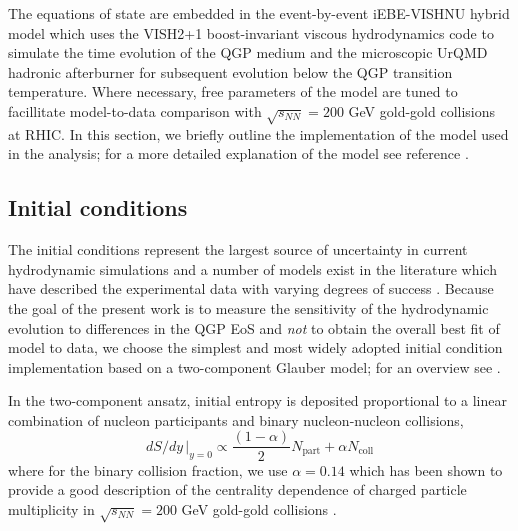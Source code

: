\documentclass[aps,prc,reprint,amsmath,nofootinbib,superscriptaddress]{revtex4-1}
\begin{document}
The equations of state are embedded in the event-by-event iEBE-VISHNU hybrid model which uses the VISH2+1 boost-invariant viscous hydrodynamics code \cite{Song:2007ux} to simulate the 
time evolution of the QGP medium and the microscopic UrQMD hadronic afterburner \cite{Bass:1998ca, Bleicher:1999xi} for subsequent evolution below the QGP transition temperature. Where necessary, free parameters of the model are tuned to facillitate model-to-data comparison with $\sqrt{s_{NN}}=200$ GeV gold-gold collisions at RHIC. In this section, we briefly outline
the implementation of the model used in the analysis; for a more detailed explanation of the model see reference \cite{Shen:2014vra}. 


\subsection{Initial conditions}
\label{initial_condition}

The initial conditions represent the largest source of uncertainty in current hydrodynamic simulations and a number of models exist in the literature which have described
the experimental data with varying degrees of success \cite{Schenke:2012wb, Niemi:2015qia, Chatterjee:2015aja, Moreland:2014oya, Drescher:2006pi, Adler:2013aqf}. Because the goal of the present work is to measure the sensitivity of the hydrodynamic evolution to differences in the QGP EoS and \emph{not} to obtain the overall best fit of model to data, we choose the simplest and most widely adopted initial condition implementation based on a two-component Glauber model; for an overview see \cite{Miller:2007ri}.

In the two-component ansatz, initial entropy is deposited proportional to a linear combination of nucleon participants and binary nucleon-nucleon collisions,
\begin{equation}
 dS/dy \,\vert_{y=0} \propto \frac{(1-\alpha)}{2}N_\text{part} + \alpha N_\text{coll}
 \label{twocomponent}
\end{equation}
where for the binary collision fraction, we use $\alpha=0.14$ which has been shown to provide a good description of the centrality dependence of charged particle 
multiplicity in $\sqrt{s_{NN}}=200$ GeV gold-gold collisions \cite{Shen:2014sfi}.
\end{document}

